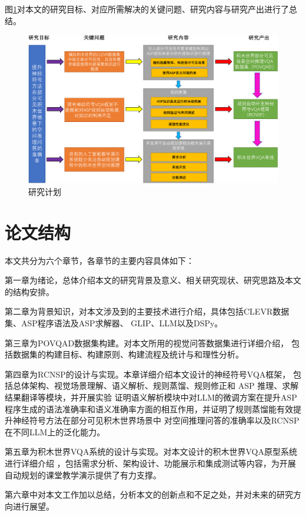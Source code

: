 图\ref{plan}对本文的研究目标、对应所需解决的关键问题、研究内容与研究产出进行了总结。
\begin{figure}[h]
    \centering
    \includegraphics[width=\textwidth]{figures/研究方法-crop.pdf}
    \caption{研究计划}
    \label{plan}
\end{figure}
\section{论文结构}
本文共分为六个章节，各章节的主要内容具体如下：

第一章为绪论，总体介绍本文的研究背景及意义、相关研究现状、研究思路及本文的结构安排。

第二章为背景知识，对本文涉及到的主要技术进行介绍，具体包括CLEVR数据集、ASP程序语法及ASP求解器、
GLIP、LLM以及DSPy。

第三章为POVQAD数据集构建。对本文所用的视觉问答数据集进行详细介绍，
包括数据集的构建目标、构建原则、构建流程及统计与和理性分析。

第四章为RCNSP的设计与实现。本章详细介绍本文设计的神经符号VQA框架，
包括总体架构、视觉场景理解、语义解析、规则蒸馏、规则修正和 ASP 推理、求解结果翻译等模块，并开展实验
证明语义解析模块中对LLM的微调方案在提升ASP程序生成的语法准确率和语义准确率方面的相互作用，并证明了规则蒸馏能有效提升神经符号方法在部分可见积木世界场景中
对空间推理问答的准确率以及RCNSP在不同LLM上的泛化能力。

第五章为积木世界VQA系统的设计与实现。对本文设计的积木世界VQA原型系统进行详细介绍
，包括需求分析、架构设计、功能展示和集成测试等内容，为开展自动规划的课堂教学演示提供了有力支撑。

第六章中对本文工作加以总结，分析本文的创新点和不足之处，并对未来的研究方向进行展望。